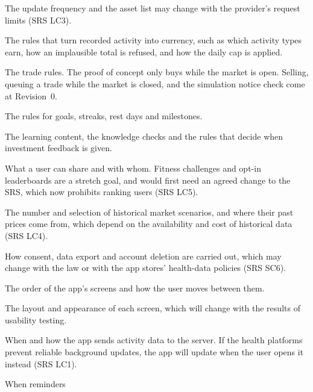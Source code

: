 \documentclass[12pt, titlepage]{article}
\newcounter{acnum}
\newcommand{\actheacnum}{AC\theacnum}
\begin{document}
\begin{description}
  The update frequency and the asset list may change with the provider's
  request limits (SRS LC3).
\item[\refstepcounter{acnum} \actheacnum \label{acActivity}:] The rules that
  turn recorded activity into currency, such as which activity types earn, how
  an implausible total is refused, and how the daily cap is applied.
\item[\refstepcounter{acnum} \actheacnum \label{acTrading}:] The trade rules.
  The proof of concept only buys while the market is open. Selling, queuing a
  trade while the market is closed, and the simulation notice check come at
  Revision~0.
\item[\refstepcounter{acnum} \actheacnum \label{acGoals}:] The rules for goals,
  streaks, rest days and milestones.
\item[\refstepcounter{acnum} \actheacnum \label{acLearning}:] The learning
  content, the knowledge checks and the rules that decide when investment
  feedback is given.
\item[\refstepcounter{acnum} \actheacnum \label{acSocial}:] What a user can
  share and with whom. Fitness challenges and opt-in leaderboards are a stretch
  goal, and would first need an agreed change to the SRS, which now prohibits
  ranking users (SRS LC5).
\item[\refstepcounter{acnum} \actheacnum \label{acScenarios}:] The number and
  selection of historical market scenarios, and where their past prices come
  from, which depend on the availability and cost of historical data (SRS LC4).
\item[\refstepcounter{acnum} \actheacnum \label{acPrivacy}:] How consent, data
  export and account deletion are carried out, which may change with the law or
  with the app stores' health-data policies (SRS SC6).
\item[\refstepcounter{acnum} \actheacnum \label{acNavigation}:] The order of
  the app's screens and how the user moves between them.
\item[\refstepcounter{acnum} \actheacnum \label{acScreens}:] The layout and
  appearance of each screen, which will change with the results of usability
  testing.
\item[\refstepcounter{acnum} \actheacnum \label{acSync}:] When and how the app
  sends activity data to the server. If the health platforms prevent reliable
  background updates, the app will update when the user opens it instead (SRS
  LC1).
\item[\refstepcounter{acnum} \actheacnum \label{acReminders}:] When reminders

\end{description}
\end{document}
